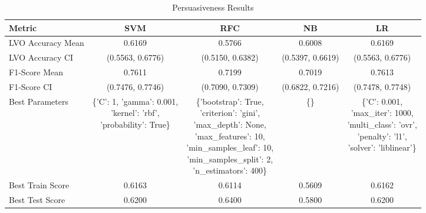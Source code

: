 \begin{table}[h!]
\centering
\begin{tabular}{|l|c|c|c|c|}
\hline
\textbf{Metric}           & \textbf{SVM}    & \textbf{RFC}    & \textbf{NB}     & \textbf{LR}     \\ \hline
LVO Accuracy Mean         & 0.6169          & 0.5766          & 0.6008          & 0.6169          \\ \hline
LVO Accuracy CI           & (0.5563, 0.6776)& (0.5150, 0.6382)& (0.5397, 0.6619)& (0.5563, 0.6776)\\ \hline
F1-Score Mean             & 0.7611          & 0.7199          & 0.7019          & 0.7613          \\ \hline
F1-Score CI               & (0.7476, 0.7746)& (0.7090, 0.7309)& (0.6822, 0.7216)& (0.7478, 0.7748)\\ \hline
Best Parameters           & \makecell[l]{\{'C': 1, 'gamma': 0.001,\\ 'kernel': 'rbf',\\ 'probability': True\}} & \makecell[l]{\{'bootstrap': True,\\ 'criterion': 'gini',\\ 'max\_depth': None,\\ 'max\_features': 10,\\ 'min\_samples\_leaf': 10,\\ 'min\_samples\_split': 2,\\ 'n\_estimators': 400\}} & \{\} & \makecell[l]{\{'C': 0.001,\\ 'max\_iter': 1000,\\ 'multi\_class': 'ovr',\\ 'penalty': 'l1',\\ 'solver': 'liblinear'\}} \\ \hline
Best Train Score          & 0.6163          & 0.6114          & 0.5609          & 0.6162          \\ \hline
Best Test Score           & 0.6200          & 0.6400          & 0.5800          & 0.6200          \\ \hline
\end{tabular}
\caption{Persuasiveness Results}
\label{table:persuasiveness}
\end{table}

